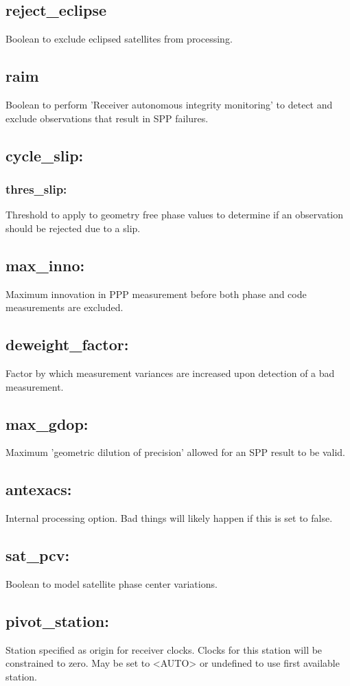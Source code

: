 \subsection{reject\_eclipse}
Boolean to exclude eclipsed satellites from processing.
\subsection{raim}
Boolean to perform 'Receiver autonomous integrity monitoring' to detect and exclude observations that result in SPP failures.
\subsection{cycle\_slip:}
\subsubsection{thres\_slip:}
Threshold to apply to geometry free phase values to determine if an observation should be rejected due to a slip.
\subsection{max\_inno:}
Maximum innovation in PPP measurement before both phase and code measurements are excluded.
\subsection{deweight\_factor:}
Factor by which measurement variances are increased upon detection of a bad measurement.
\subsection{max\_gdop:}
Maximum 'geometric dilution of precision' allowed for an SPP result to be valid.
\subsection{antexacs:}
Internal processing option. Bad things will likely happen if this is set to false.
\subsection{sat\_pcv:}
Boolean to model satellite phase center variations.
\subsection{pivot\_station:}
Station specified as origin for receiver clocks. Clocks for this station will be constrained to zero. May be set to <AUTO> or undefined to use first available station.
